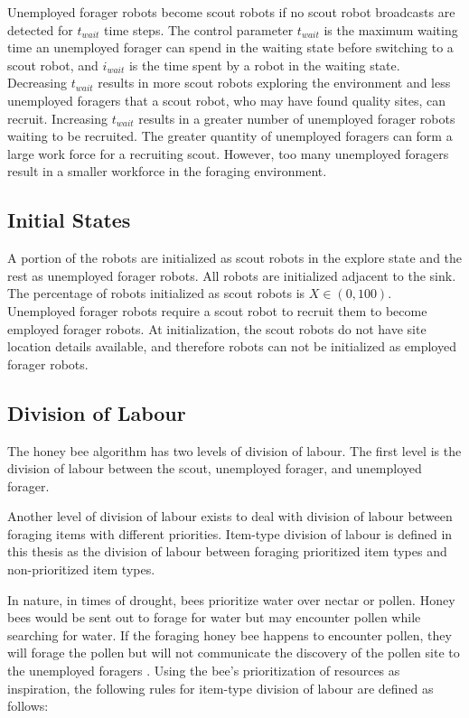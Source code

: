 Unemployed forager robots become scout robots if no scout robot broadcasts are detected for $t_{wait}$ time steps. The control parameter $t_{wait}$ is the maximum waiting time an unemployed forager can spend in the waiting state before switching to a scout robot, and $i_{wait}$ is the time spent by a robot in the waiting state. Decreasing $t_{wait}$ results in more scout robots exploring the environment and less unemployed foragers that a scout robot, who may have found quality sites, can recruit. Increasing $t_{wait}$ results in a greater number of unemployed forager robots waiting to be recruited. The greater quantity of unemployed foragers can form a large work force for a recruiting scout. However, too many unemployed foragers result in a smaller workforce in the foraging environment.

\subsection{Initial States}
\label{initialstates}

A portion of the robots are initialized as scout robots in the explore state and the rest as unemployed forager robots. All robots are initialized adjacent to the sink. The percentage of robots initialized as scout robots is $X\in(0,100)$. Unemployed forager robots require a scout robot to recruit them to become employed forager robots. At initialization, the scout robots do not have site location details available, and therefore robots can not be initialized as employed forager robots. 

\subsection{Division of Labour}
\label{natureinspired:divisionoflabour}
The honey bee algorithm has two levels of division of labour. The first level is the division of labour between the scout, unemployed forager, and unemployed forager.

Another level of division of labour exists to deal with division of labour between foraging items with different priorities. Item-type division of labour is defined in this thesis as the division of labour between foraging prioritized item types and non-prioritized item types.

In nature, in times of drought, bees prioritize water over nectar or pollen. Honey bees would be sent out to forage for water but may encounter pollen while searching for water. If the foraging honey bee happens to encounter pollen, they will forage the pollen but will not communicate the discovery of the pollen site to the unemployed foragers \cite{seeley2009wisdom}. Using the bee's prioritization of resources as inspiration, the following rules for item-type division of labour are defined as follows:

